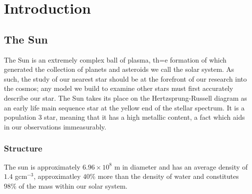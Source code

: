 
\newcommand{\pd}[2]{\frac{\partial #1}{\partial #2 }}
\newcommand{\td}[2]{\frac{d #1}{d #2 }}
\newcommand{\mb}[1]{\mathbf{#1}}
\newcommand{\divv}[1]{\bigtriangledown{#1}}
\newcommand{\del}{\bigtriangledown}

\label{ch:Intro}
\chapter{Introduction}  %





\section{The Sun}
The Sun is an extremely complex ball of plasma, th=e formation of which generated the collection of planets and asteroids we call the solar system.
As such, the study of our nearest star should be at the forefront of our research into the cosmos; any model we build to examine other stars must first accurately describe our star. 
The Sun takes its place on the Hertzsprung-Russell \citep{Hertzsprung} \citep{Russell1914} diagram as an early life main sequence star at the yellow end of the stellar spectrum.
It is a population 3 star, meaning that it has a high metallic content, a fact which aids in our observations immeasurably.

\subsection{Structure}
The sun is approximately $6.96 \times 10^{8}$ m in diameter and has an average density of $1.4$ gcm$^{-3}$, approximatley $40\%$ more than the density of water and constitutes $98\%$ of the mass within our solar system.

